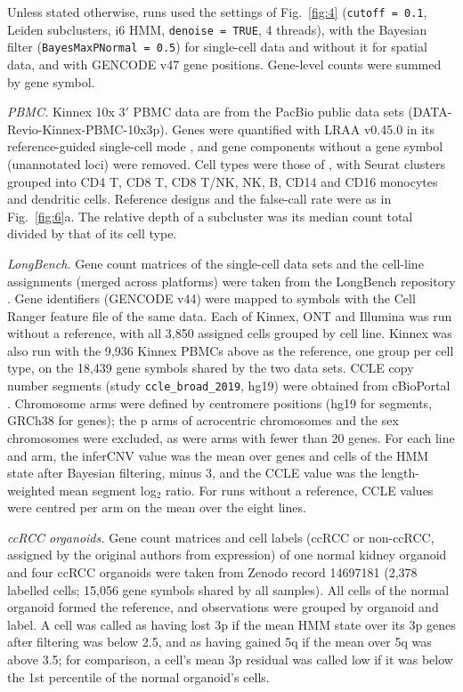 Unless stated otherwise, runs used the settings of Fig.~\ref{fig:4} (\texttt{cutoff\ =\ 0.1}, Leiden subclusters, i6 HMM, \texttt{denoise\ =\ TRUE}, 4 threads), with the Bayesian filter (\texttt{BayesMaxPNormal\ =\ 0.5}) for single-cell data and without it for spatial data, and with GENCODE v47 gene positions. Gene-level counts were summed by gene symbol.

\emph{PBMC.} Kinnex 10x 3$'$ PBMC data are from the PacBio public data sets (DATA-Revio-Kinnex-PBMC-10x3p). Genes were quantified with LRAA v0.45.0 in its reference-guided single-cell mode \citep{yu2026lraa}, and gene components without a gene symbol (unannotated loci) were removed. Cell types were those of \citet{yu2026lraa}, with Seurat clusters grouped into CD4 T, CD8 T, CD8 T/NK, NK, B, CD14 and CD16 monocytes and dendritic cells. Reference designs and the false-call rate were as in Fig.~\ref{fig:6}a. The relative depth of a subcluster was its median count total divided by that of its cell type.

\emph{LongBench.} Gene count matrices of the single-cell data sets and the cell-line assignments (merged across platforms) were taken from the LongBench repository \citep{you2025longbench}. Gene identifiers (GENCODE v44) were mapped to symbols with the Cell Ranger feature file of the same data. Each of Kinnex, ONT and Illumina was run without a reference, with all 3,850 assigned cells grouped by cell line. Kinnex was also run with the 9,936 Kinnex PBMCs above as the reference, one group per cell type, on the 18,439 gene symbols shared by the two data sets. CCLE copy number segments (study \texttt{ccle\_broad\_2019}, hg19) were obtained from cBioPortal \citep{cerami2012cbioportal, ghandi2019ccle}. Chromosome arms were defined by centromere positions (hg19 for segments, GRCh38 for genes); the p arms of acrocentric chromosomes and the sex chromosomes were excluded, as were arms with fewer than 20 genes. For each line and arm, the inferCNV value was the mean over genes and cells of the HMM state after Bayesian filtering, minus 3, and the CCLE value was the length-weighted mean segment log$_2$ ratio. For runs without a reference, CCLE values were centred per arm on the mean over the eight lines.

\emph{ccRCC organoids.} Gene count matrices and cell labels (ccRCC or non-ccRCC, assigned by the original authors from expression) of one normal kidney organoid and four ccRCC organoids were taken from Zenodo record 14697181 \citep{zajac2025ccrcc} (2,378 labelled cells; 15,056 gene symbols shared by all samples). All cells of the normal organoid formed the reference, and observations were grouped by organoid and label. A cell was called as having lost 3p if the mean HMM state over its 3p genes after filtering was below 2.5, and as having gained 5q if the mean over 5q was above 3.5; for comparison, a cell's mean 3p residual was called low if it was below the 1st percentile of the normal organoid's cells.

